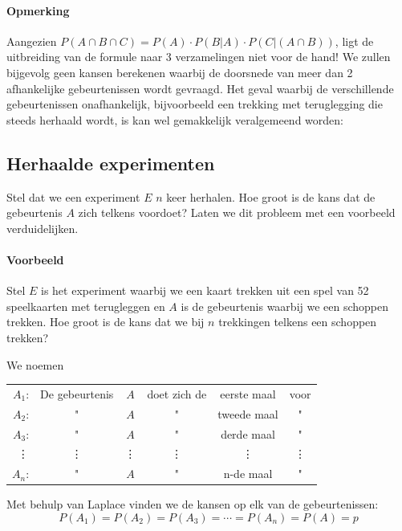 \documentclass[12pt,twoside]{article}
\begin{document}
\paragraph*{Opmerking}

Aangezien $P(A\cap B\cap C)=P(A)\cdot P(B|A) \cdot P(C|(A\cap B))$, ligt de uitbreiding van de formule naar 3 verzamelingen niet voor de hand! We zullen bijgevolg geen kansen berekenen waarbij de doorsnede van meer dan 2 afhankelijke gebeurtenissen wordt gevraagd. Het geval waarbij de verschillende gebeurtenissen onafhankelijk, bijvoorbeeld een trekking met teruglegging die steeds herhaald wordt, is kan wel gemakkelijk veralgemeend worden:

\subsection{Herhaalde experimenten}

Stel dat we een experiment $E$ $n$ keer herhalen. Hoe groot is de kans dat de gebeurtenis $A$ zich telkens voordoet?
Laten we dit probleem met een voorbeeld verduidelijken.


\paragraph*{Voorbeeld}
Stel $E$ is het experiment waarbij we een kaart trekken uit een spel van 52 speelkaarten met terugleggen en $A$ is de gebeurtenis waarbij we een schoppen trekken.
Hoe groot is de kans dat we bij $n$ trekkingen telkens een schoppen trekken?

We noemen 
\begin{center}
  \renewcommand{\arraystretch}{1}
  \begin{tabular}{r@{ }c@{ }c@{ }c@{ }c@{ }c}
    $A_1$: & De gebeurtenis & $A$ & doet zich de & eerste maal & voor\\
    $A_2$: &        "       & $A$ &       "      & tweede maal &   " \\
    $A_3$: &        "       & $A$ &       "      & derde maal &   " \\
    \vdots &    \vdots      & \vdots &  \vdots   &  \vdots  &\vdots \\
    $A_n$: &        "       & $A$ &       "      & n-de maal &   " \\
  \end{tabular}
\end{center}

Met behulp van Laplace vinden we de kansen op elk van de gebeurtenissen:
$$P(A_1)=P(A_2)=P(A_3)=\cdots=P(A_n)=P(A)=p$$
\end{document}
